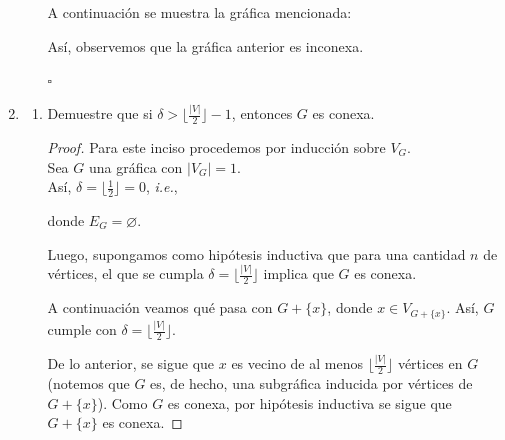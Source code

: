 \documentclass{article}
\begin{document}
\begin{enumerate}
\begin{enumerate}
      A continuación se muestra la gráfica mencionada:

      \begin{figure}[ht!]
        \centering
      \end{figure}

      Así, observemos que la gráfica anterior es inconexa.

      \hfill $\square$
  \end{enumerate}

  \item \begin{enumerate}

    \item Demuestre que si $\delta > \lfloor \frac{|V|}{2} \rfloor - 1$,
      entonces $G$ es conexa.

      \renewcommand\qedsymbol{QED}
      \begin{proof}
        Para este inciso procedemos por inducción sobre $V_G$. \\
        Sea $G$ una gráfica con $|V_G| = 1$. \\
        Así, $\delta = \lfloor \frac{1}{2} \rfloor = 0$, \textit{i.e.},

        \begin{figure}[ht!]
          \centering
        \end{figure}

        donde $E_G = \varnothing$.
        
        Luego, supongamos como hipótesis inductiva que para una cantidad $n$ de
        vértices, el que se cumpla $\delta = \lfloor \frac{|V|}{2} \rfloor$ implica
        que $G$ es conexa.
        
        A continuación veamos qué pasa con $G + \{x\}$, donde $x \in V_{G + \{x\}}$.
        Así, $G$ cumple con $\delta = \lfloor \frac{|V|}{2} \rfloor$.
        
        De lo anterior, se sigue que $x$ es vecino de al menos $\lfloor \frac{|V|}{2}
        \rfloor$ vértices en $G$ (notemos que $G$ es, de hecho, una subgráfica inducida
        por vértices de $G +\{x\}$). Como $G$ es conexa, por hipótesis inductiva se sigue
        que $G + \{x\}$ es conexa. 
      \end{proof}


\end{enumerate}
\end{enumerate}
\end{document}
